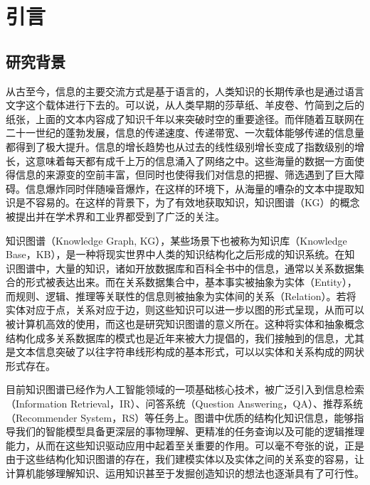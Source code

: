 \chapter{引言}
\label{cha:intro}


\section{研究背景}

从古至今，信息的主要交流方式是基于语言的，人类知识的长期传承也是通过语言文字这个载体进行下去的。可以说，从人类早期的莎草纸、羊皮卷、竹简到之后的纸张，上面的文本内容成了知识千年以来突破时空的重要途径。而伴随着互联网在二十一世纪的蓬勃发展，信息的传递速度、传递带宽、一次载体能够传递的信息量都得到了极大提升。信息的增长趋势也从过去的线性级别增长变成了指数级别的增长，这意味着每天都有成千上万的信息涌入了网络之中。这些海量的数据一方面使得信息的来源变的空前丰富，但同时也使得我们对信息的把握、筛选遇到了巨大障碍。信息爆炸同时伴随噪音爆炸，在这样的环境下，从海量的嘈杂的文本中提取知识是不容易的。在这样的背景下，为了有效地获取知识，知识图谱（KG）的概念被提出并在学术界和工业界都受到了广泛的关注。

知识图谱（Knowledge Graph, KG），某些场景下也被称为知识库（Knowledge Base，KB），是一种将现实世界中人类的知识结构化之后形成的知识系统。在知识图谱中，大量的知识，诸如开放数据库和百科全书中的信息，通常以关系数据集合的形式被表达出来。而在关系数据集合中，基本事实被抽象为实体（Entity），而规则、逻辑、推理等关联性的信息则被抽象为实体间的关系（Relation）。若将实体对应于点，关系对应于边，则这些知识可以进一步以图的形式呈现，从而可以被计算机高效的使用，而这也是研究知识图谱的意义所在。这种将实体和抽象概念结构化成多关系数据库的模式也是近年来被大力提倡的，我们接触到的信息，尤其是文本信息突破了以往字符串线形构成的基本形式，可以以实体和关系构成的网状形式存在。

目前知识图谱已经作为人工智能领域的一项基础核心技术，被广泛引入到信息检索（Information Retrieval，IR）、问答系统（Question Answering，QA）、推荐系统（Recommender System，RS）等任务上。图谱中优质的结构化知识信息，能够指导我们的智能模型具备更深层的事物理解、更精准的任务查询以及可能的逻辑推理能力，从而在这些知识驱动应用中起着至关重要的作用。可以毫不夸张的说，正是由于这些结构化知识图谱的存在，我们建模实体以及实体之间的关系变的容易，让计算机能够理解知识、运用知识甚至于发掘创造知识的想法也逐渐具有了可行性。

